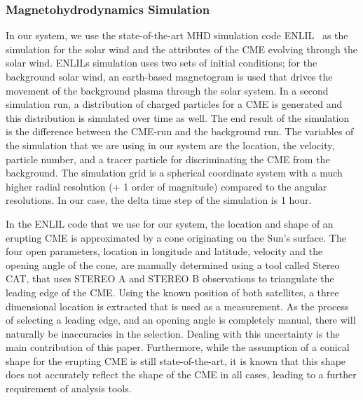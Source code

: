 \documentclass[journal]{vgtc}                %
\begin{document}
\subsubsection{Magnetohydrodynamics Simulation} \label{sec:mhd}
In our system, we use the state-of-the-art MHD simulation code ENLIL~\cite{odstrcil2002merging} as the simulation for the solar wind and the attributes of the CME evolving through the solar wind. ENLILs simulation uses two sets of initial conditions; for the background solar wind, an earth-based magnetogram is used that drives the movement of the background plasma through the solar system. In a second simulation run, a distribution of charged particles for a CME is generated and this distribution is simulated over time as well. The end result of the simulation is the difference between the CME-run and the background run. The variables of the simulation that we are using in our system are the location, the velocity, particle number, and a tracer particle for discriminating the CME from the background. The simulation grid is a spherical coordinate system with a much higher radial resolution (+ 1 order of magnitude) compared to the angular resolutions. In our case, the delta time step of the simulation is 1 hour.

In the ENLIL code that we use for our system, the location and shape of an erupting CME is approximated by a cone originating on the Sun's surface. The four open parameters, location in longitude and latitude, velocity and the opening angle of the cone, are manually determined using a tool called Stereo CAT, that uses STEREO A and STEREO B observations to triangulate the leading edge of the CME. Using the known position of both satellites, a three dimensional location is extracted that is used as a measurement. As the process of selecting a leading edge, and an opening angle is completely manual, there will naturally be inaccuracies in the selection. Dealing with this uncertainty is the main contribution of this paper. Furthermore, while the assumption of a conical shape for the erupting CME is still state-of-the-art, it is known that this shape does not accurately reflect the shape of the CME in all cases, leading to a further requirement of analysis tools.
\end{document}
